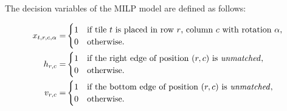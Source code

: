 \documentclass[preprint,12pt]{elsarticle}
\begin{document}
\noindent
The decision variables of the MILP model are defined as follows:
{\allowdisplaybreaks
\begin{align*}
x_{t,r,c,\alpha} = & \begin{cases} 
1 & \textrm{if tile $t$ is placed in row $r$, column $c$ with rotation $\alpha$},\\
0 & \textrm{otherwise}.
\end{cases}\\
h_{r,c} = & \begin{cases} 1 & \textrm{if the right edge of position $(r,c)$ is \emph{unmatched}},\\
0 & \textrm{otherwise}.
\end{cases}\\
v_{r,c} = & \begin{cases} 1 & \textrm{if the bottom edge of position $(r,c)$ is \emph{unmatched}},\\
0 & \textrm{otherwise}.
\end{cases}
\end{align*}

}
\end{document}
